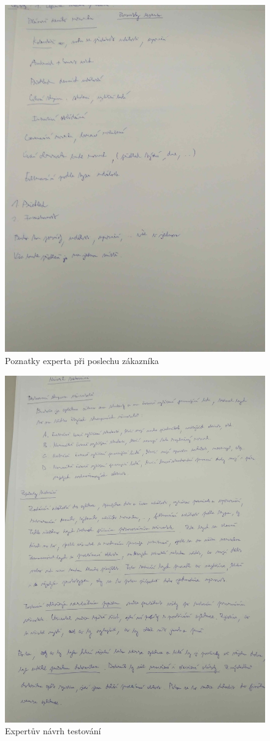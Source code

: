 \documentclass[a4paper, 11pt]{article}
\begin{document}
	\begin{figure}[ht]
		\centering
		\includegraphics[width=0.98\linewidth]{poznatky_experta_pri_poslechu_zakaznika.jpg}
		\caption{Poznatky experta při poslechu zákazníka}
	\end{figure}

	\begin{figure}[ht]
		\centering
		\includegraphics[width=0.98\linewidth]{expertuv_navrh_testovani.jpg}
		\caption{Expertův návrh testování}
	\end{figure}
\end{document}
